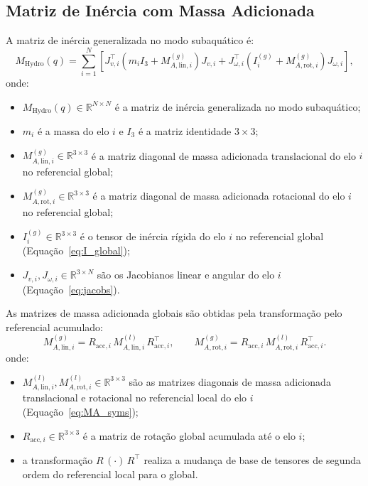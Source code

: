 \subsection{Matriz de Inércia com Massa Adicionada}

A matriz de inércia generalizada no modo subaquático é:
\begin{equation}
    M_{\text{Hydro}}(q) = \sum_{i=1}^{N} \left[
        J_{v,i}^\top \left(m_i I_3 + M_{A,\text{lin},i}^{(g)}\right) J_{v,i}
        + J_{\omega,i}^\top \left(I_i^{(g)} + M_{A,\text{rot},i}^{(g)}\right) J_{\omega,i}
    \right],
    \label{eq:M_hydro_impl}
\end{equation}
onde:
\begin{itemize}
    \item $M_{\text{Hydro}}(q) \in \mathbb{R}^{N\times N}$ é a matriz de inércia generalizada no modo subaquático;
    \item $m_i$ é a massa do elo $i$ e $I_3$ é a matriz identidade $3\times 3$;
    \item $M_{A,\text{lin},i}^{(g)} \in \mathbb{R}^{3\times 3}$ é a matriz diagonal de massa adicionada translacional do elo $i$ no referencial global;
    \item $M_{A,\text{rot},i}^{(g)} \in \mathbb{R}^{3\times 3}$ é a matriz diagonal de massa adicionada rotacional do elo $i$ no referencial global;
    \item $I_i^{(g)} \in \mathbb{R}^{3\times 3}$ é o tensor de inércia rígida do elo $i$ no referencial global (Equação~\eqref{eq:I_global});
    \item $J_{v,i}, J_{\omega,i} \in \mathbb{R}^{3\times N}$ são os Jacobianos linear e angular do elo $i$ (Equação~\eqref{eq:jacobs}).
\end{itemize}

As matrizes de massa adicionada globais são obtidas pela transformação pelo referencial acumulado:
\begin{equation}
    M_{A,\text{lin},i}^{(g)} = R_{\text{acc},i}\, M_{A,\text{lin},i}^{(l)}\, R_{\text{acc},i}^\top, \qquad
    M_{A,\text{rot},i}^{(g)} = R_{\text{acc},i}\, M_{A,\text{rot},i}^{(l)}\, R_{\text{acc},i}^\top.
    \label{eq:MA_global}
\end{equation}
onde:
\begin{itemize}
    \item $M_{A,\text{lin},i}^{(l)}, M_{A,\text{rot},i}^{(l)} \in \mathbb{R}^{3\times 3}$ são as matrizes diagonais de massa adicionada translacional e rotacional no referencial local do elo $i$ (Equação~\eqref{eq:MA_syms});
    \item $R_{\text{acc},i} \in \mathbb{R}^{3\times 3}$ é a matriz de rotação global acumulada até o elo $i$;
    \item a transformação $R\,(\cdot)\,R^\top$ realiza a mudança de base de tensores de segunda ordem do referencial local para o global.
\end{itemize}

